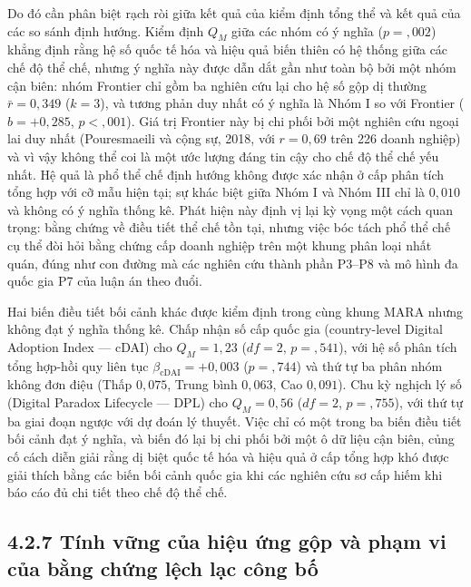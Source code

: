 \documentclass[
  a4paper,
  13pt]{extreport}
\begin{document}
Do đó cần phân biệt rạch ròi giữa kết quả của kiểm định tổng thể và kết
quả của các so sánh định hướng. Kiểm định \(Q_M\) giữa các nhóm có ý
nghĩa (\(p = {,}002\)) khẳng định rằng hệ số quốc tế hóa và hiệu quả
biến thiên có hệ thống giữa các chế độ thể chế, nhưng ý nghĩa này được
dẫn dắt gần như toàn bộ bởi một nhóm cận biên: nhóm Frontier chỉ gồm ba
nghiên cứu lại cho hệ số gộp dị thường \(\bar{r} = 0{,}349\)
(\(k = 3\)), và tương phản duy nhất có ý nghĩa là Nhóm I so với Frontier
(\(b = +0{,}285\), \(p < {,}001\)). Giá trị Frontier này bị chi phối bởi
một nghiên cứu ngoại lai duy nhất (Pouresmaeili và cộng sự, 2018, với
\(r = 0{,}69\) trên 226 doanh nghiệp) và vì vậy không thể coi là một ước
lượng đáng tin cậy cho chế độ thể chế yếu nhất. Hệ quả là phổ thể chế
định hướng không được xác nhận ở cấp phân tích tổng hợp với cỡ mẫu hiện
tại; sự khác biệt giữa Nhóm I và Nhóm III chỉ là \(0{,}010\) và không có
ý nghĩa thống kê. Phát hiện này định vị lại kỳ vọng một cách quan trọng:
bằng chứng về điều tiết thể chế tồn tại, nhưng việc bóc tách phổ thể chế
cụ thể đòi hỏi bằng chứng cấp doanh nghiệp trên một khung phân loại nhất
quán, đúng như con đường mà các nghiên cứu thành phần P3--P8 và mô hình
đa quốc gia P7 của luận án theo đuổi.

Hai biến điều tiết bối cảnh khác được kiểm định trong cùng khung MARA
nhưng không đạt ý nghĩa thống kê. Chấp nhận số cấp quốc gia
(country-level Digital Adoption Index --- cDAI) cho \(Q_M = 1{,}23\)
(\(df = 2\), \(p = {,}541\)), với hệ số phân tích tổng hợp-hồi quy liên
tục \(\beta_{\text{cDAI}} = +0{,}003\) (\(p = {,}744\)) và thứ tự ba
phân nhóm không đơn điệu (Thấp \(0{,}075\), Trung bình \(0{,}063\), Cao
\(0{,}091\)). Chu kỳ nghịch lý số (Digital Paradox Lifecycle --- DPL)
cho \(Q_M = 0{,}56\) (\(df = 2\), \(p = {,}755\)), với thứ tự ba giai
đoạn ngược với dự đoán lý thuyết. Việc chỉ có một trong ba biến điều
tiết bối cảnh đạt ý nghĩa, và biến đó lại bị chi phối bởi một ô dữ liệu
cận biên, củng cố cách diễn giải rằng dị biệt quốc tế hóa và hiệu quả ở
cấp tổng hợp khó được giải thích bằng các biến bối cảnh quốc gia khi các
nghiên cứu sơ cấp hiếm khi báo cáo đủ chi tiết theo chế độ thể chế.

\hypertarget{tuxednh-vux1eefng-cux1ee7a-hiux1ec7u-ux1ee9ng-gux1ed9p-vuxe0-phux1ea1m-vi-cux1ee7a-bux1eb1ng-chux1ee9ng-lux1ec7ch-lux1ea1c-cuxf4ng-bux1ed1}{%
\subsection{4.2.7 Tính vững của hiệu ứng gộp và phạm vi của bằng chứng
lệch lạc công
bố}\label{tuxednh-vux1eefng-cux1ee7a-hiux1ec7u-ux1ee9ng-gux1ed9p-vuxe0-phux1ea1m-vi-cux1ee7a-bux1eb1ng-chux1ee9ng-lux1ec7ch-lux1ea1c-cuxf4ng-bux1ed1}}
\end{document}
